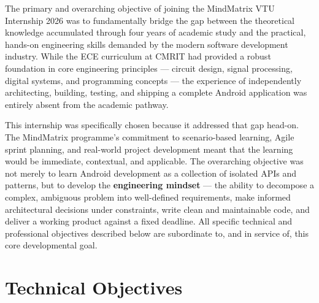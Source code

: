 \documentclass[12pt,a4paper]{report}
\begin{document}
The primary and overarching objective of joining the MindMatrix VTU Internship 2026 was to fundamentally bridge the gap between the theoretical knowledge accumulated through four years of academic study and the practical, hands-on engineering skills demanded by the modern software development industry. While the ECE curriculum at CMRIT had provided a robust foundation in core engineering principles — circuit design, signal processing, digital systems, and programming concepts — the experience of independently architecting, building, testing, and shipping a complete Android application was entirely absent from the academic pathway.

\vspace{0.4cm}

This internship was specifically chosen because it addressed that gap head-on. The MindMatrix programme's commitment to scenario-based learning, Agile sprint planning, and real-world project development meant that the learning would be immediate, contextual, and applicable. The overarching objective was not merely to learn Android development as a collection of isolated APIs and patterns, but to develop the \textbf{engineering mindset} — the ability to decompose a complex, ambiguous problem into well-defined requirements, make informed architectural decisions under constraints, write clean and maintainable code, and deliver a working product against a fixed deadline. All specific technical and professional objectives described below are subordinate to, and in service of, this core developmental goal.

\section{Technical Objectives}
\end{document}
